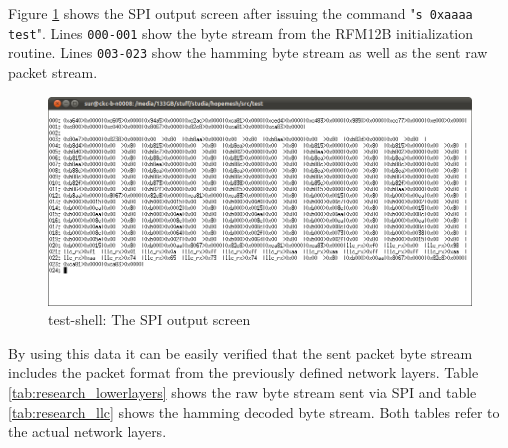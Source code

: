 Figure \ref{fig:test-shell2} shows the SPI output screen after issuing the command "\texttt{s 0xaaaa test}". Lines \texttt{000-001} show the byte stream from the RFM12B initialization routine. Lines \texttt{003-023} show the hamming byte stream as well as the sent raw packet stream.

\begin{figure}[H]
\centering
\includegraphics[width=\textwidth]{figures/research-shell2.png}
\caption{test-shell: The SPI output screen}
\label{fig:test-shell2}
\end{figure}

By using this data it can be easily verified that the sent packet byte stream includes the packet format from the previously defined network layers. Table \ref{tab:research_lowerlayers} shows the raw byte stream sent via SPI and table \ref{tab:research_llc} shows the hamming decoded byte stream. Both tables refer to the actual network layers.

